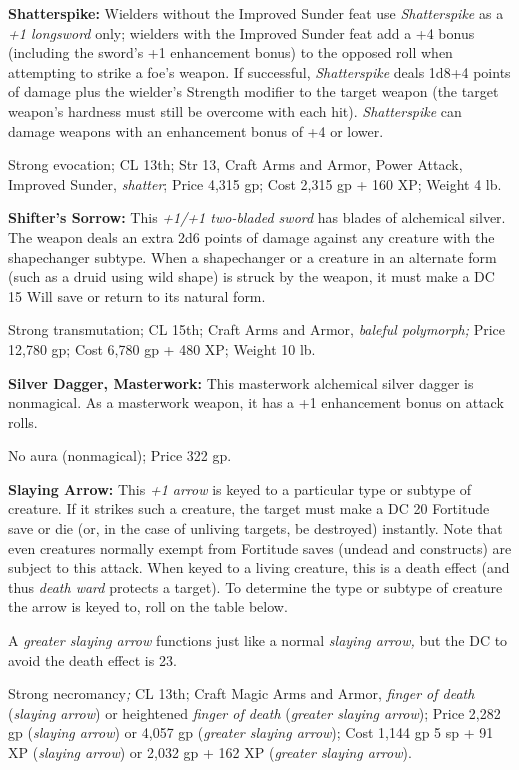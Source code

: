 \textbf{Shatterspike:} Wielders without the Improved Sunder feat use \textit{Shatterspike 
}as a \textit{+1 longsword }only; wielders with the Improved Sunder feat add a 
+4 bonus (including the sword's +1 enhancement bonus) to the opposed roll when 
attempting to strike a foe's weapon. If successful, \textit{Shatterspike }deals 
1d8+4 points of damage plus the wielder's Strength modifier to the target weapon 
(the target weapon's hardness must still be overcome with each hit). \textit{Shatterspike 
}can damage weapons with an enhancement bonus of +4 or lower.

Strong evocation; CL 13th; Str 13, Craft Arms and Armor, Power Attack, Improved 
Sunder, \textit{shatter}; Price 4,315 gp; Cost 2,315 gp + 160 XP; Weight 4 lb.

\textbf{Shifter's Sorrow:} This \textit{+1/+1 two-bladed sword }has blades of alchemical 
silver. The weapon deals an extra 2d6 points of damage against any creature with 
the shapechanger subtype. When a shapechanger or a creature in an alternate form 
(such as a druid using wild shape) is struck by the weapon, it must make a DC 15 
Will save or return to its natural form.

Strong transmutation; CL 15th; Craft Arms and Armor, \textit{baleful polymorph; 
}Price 12,780 gp; Cost 6,780 gp + 480 XP; Weight 10 lb.

\textbf{Silver Dagger, Masterwork:} This masterwork alchemical silver dagger is 
nonmagical. As a masterwork weapon, it has a +1 enhancement bonus on attack rolls.

No aura (nonmagical); Price 322 gp.

\textbf{Slaying Arrow:} This \textit{+1 arrow }is keyed to a particular type or 
subtype of creature. If it strikes such a creature, the target must make a DC 20 
Fortitude save or die (or, in the case of unliving targets, be destroyed) instantly. 
Note that even creatures normally exempt from Fortitude saves (undead and constructs) 
are subject to this attack. When keyed to a living creature, this is a death effect 
(and thus \textit{death ward }protects a target). To determine the type or subtype 
of creature the arrow is keyed to, roll on the table below.

A \textit{greater slaying arrow }functions just like a normal \textit{slaying arrow, 
}but the DC to avoid the death effect is 23.

Strong necromancy\textit{; }CL 13th; Craft Magic Arms and Armor, \textit{finger 
of death }(\textit{slaying arrow}) or heightened \textit{finger of death }(\textit{greater 
slaying arrow}); Price 2,282 gp (\textit{slaying arrow}) or 4,057 gp (\textit{greater 
slaying arrow}); Cost 1,144 gp 5 sp + 91 XP (\textit{slaying arrow}) or 2,032 gp 
+ 162 XP (\textit{greater slaying arrow}).

